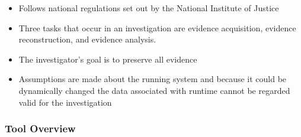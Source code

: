 \documentclass[11pt,]{article}
\providecommand{\tightlist}{%
  \setlength{\itemsep}{0pt}\setlength{\parskip}{0pt}}
\begin{document}
\begin{itemize}
\tightlist
\item
  Follows national regulations set out by the National Institute of
  Justice
\item
  Three tasks that occur in an investigation are evidence acquisition,
  evidence reconstruction, and evidence analysis.
\item
  The investigator's goal is to preserve all evidence
\item
  Assumptions are made about the running system and because it could be
  dynamically changed the data associated with runtime cannot be
  regarded valid for the investigation
\end{itemize}

\hypertarget{tool-overview}{%
\subsubsection{Tool Overview}\label{tool-overview}}
\end{document}
